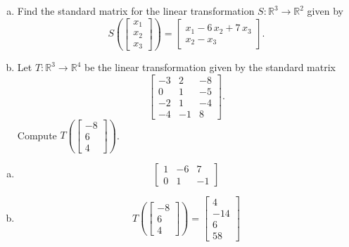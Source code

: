
\begin{exerciseStatement}

\begin{enumerate}[(a)]
\item Find the standard matrix for the linear transformation \(S:\mathbb{R}^ 3  \to \mathbb{R}^ 2 \) given by \[S\left(  \left[\begin{array}{c}
x_{1} \\
x_{2} \\
x_{3}
\end{array}\right]  \right) =  \left[\begin{array}{c}
x_{1} - 6 \, x_{2} + 7 \, x_{3} \\
x_{2} - x_{3}
\end{array}\right] .\]
\item Let \(T:\mathbb{R}^ 3  \to \mathbb{R}^ 4 \) be the linear transformation given by the standard matrix \[ \left[\begin{array}{ccc}
-3 & 2 & -8 \\
0 & 1 & -5 \\
-2 & 1 & -4 \\
-4 & -1 & 8
\end{array}\right] .\] Compute \(T\left( \left[\begin{array}{c}
-8 \\
6 \\
4
\end{array}\right]  \right)\). 
\end{enumerate}
    
\end{exerciseStatement}
    
\begin{exerciseAnswer} 

\begin{enumerate}[(a)]
\item \[ \left[\begin{array}{ccc}
1 & -6 & 7 \\
0 & 1 & -1
\end{array}\right] \]
\item \[T\left( \left[\begin{array}{c}
-8 \\
6 \\
4
\end{array}\right]  \right)= \left[\begin{array}{c}
4 \\
-14 \\
6 \\
58
\end{array}\right] \]
\end{enumerate}
    
\end{exerciseAnswer}
    
